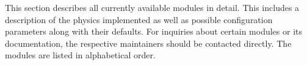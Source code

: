 This section describes all currently available \apsq modules in detail.
This includes a description of the physics implemented as well as possible configuration parameters along with their defaults.
For inquiries about certain modules or its documentation, the respective maintainers should be contacted directly.
The modules are listed in alphabetical order.
